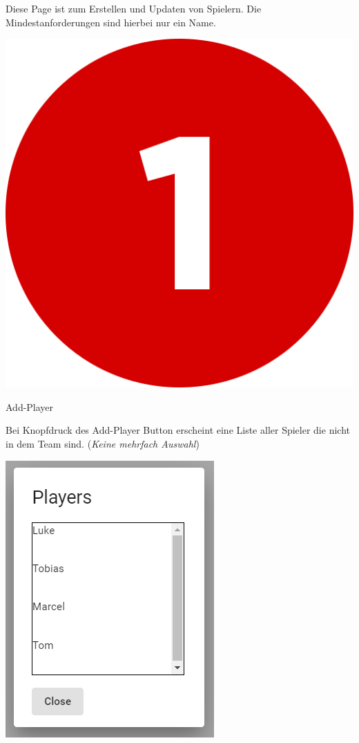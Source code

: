 Diese Page ist zum Erstellen und Updaten von Spielern. Die Mindestanforderungen sind hierbei nur ein Name.

\bigskip
\includegraphics[scale=0.05]{pics/user-guide/numbers/number-1.png} \begin{LARGE} Add-Player \end{LARGE}

Bei Knopfdruck des Add-Player Button erscheint eine Liste aller Spieler die nicht in dem Team sind.
(\textit{Keine mehrfach Auswahl}) 

\includegraphics[scale=0.5]{pics/user-guide/add-player.PNG}


